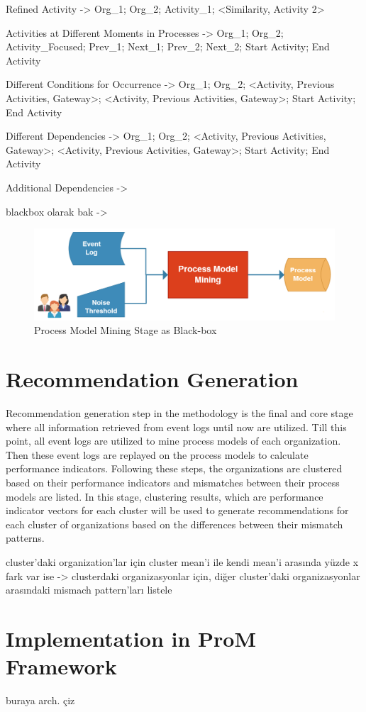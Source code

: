 Refined Activity -> Org_1; Org_2; Activity_1; {<Similarity, Activity 2>}

Activities at Different Moments in Processes -> Org_1; Org_2; Activity_Focused; Prev_1; Next_1; Prev_2; Next_2; Start Activity; End Activity

Different Conditions for Occurrence -> Org_1; Org_2; <Activity, Previous Activities, Gateway>; <Activity, Previous Activities, Gateway>; Start Activity; End Activity

Different Dependencies -> Org_1; Org_2; <Activity, Previous Activities, Gateway>; <Activity, Previous Activities, Gateway>; Start Activity; End Activity

Additional Dependencies -> 


blackbox olarak bak -> 
\begin{figure}
  \centering
  \includegraphics[width=\textwidth]{4_methodology/process-model-mining-blackbox}
  \caption{Process Model Mining Stage as Black-box }
  \label{fig:process-model-mining-blackbox}
\end{figure}

\section{Recommendation Generation}
\label{sec:recommendation-generation}
Recommendation generation step in the methodology is the final and core stage where all information retrieved from event logs until now are utilized. Till this point, all event logs are utilized to mine process models of each organization. Then these event logs are replayed on the process models to calculate performance indicators. Following these steps, the organizations are clustered based on their performance indicators and mismatches between their process models are listed. In this stage, clustering results, which are performance indicator vectors for each cluster will be used to generate recommendations for each cluster of organizations based on the differences between their mismatch patterns.

cluster'daki organization'lar için cluster mean'i ile kendi mean'i arasında yüzde x fark var ise
-> clusterdaki organizasyonlar için, diğer cluster'daki organizasyonlar arasındaki mismach pattern'ları listele


\section{Implementation in ProM Framework}
\label{sec:implementation}
buraya arch. çiz